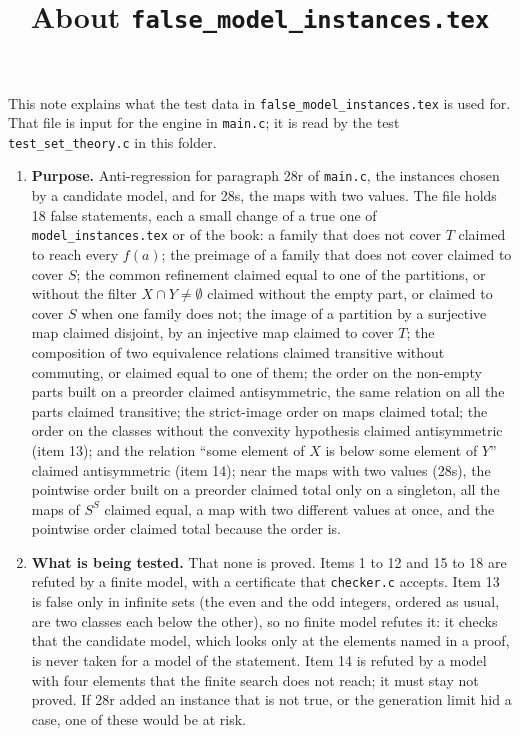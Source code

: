 \documentclass[11pt,a4paper]{article}
\title{About \texttt{false\_model\_instances.tex}}
\author{}
\date{}
\begin{document}
\maketitle
This note explains what the test data in \texttt{false\_model\_instances.tex} is used for. That file is input for the engine in \texttt{main.c}; it is read by the test \texttt{test\_set\_theory.c} in this folder.

\begin{enumerate}
\item \textbf{Purpose.} Anti-regression for paragraph 28r of \texttt{main.c}, the instances chosen by a candidate model, and for 28s, the maps with two values. The file holds 18 false statements, each a small change of a true one of \texttt{model\_instances.tex} or of the book: a family that does not cover $T$ claimed to reach every $f(a)$; the preimage of a family that does not cover claimed to cover $S$; the common refinement claimed equal to one of the partitions, or without the filter $X \cap Y \neq \emptyset$ claimed without the empty part, or claimed to cover $S$ when one family does not; the image of a partition by a surjective map claimed disjoint, by an injective map claimed to cover $T$; the composition of two equivalence relations claimed transitive without commuting, or claimed equal to one of them; the order on the non-empty parts built on a preorder claimed antisymmetric, the same relation on all the parts claimed transitive; the strict-image order on maps claimed total; the order on the classes without the convexity hypothesis claimed antisymmetric (item 13); and the relation ``some element of $X$ is below some element of $Y$'' claimed antisymmetric (item 14); near the maps with two values (28s), the pointwise order built on a preorder claimed total only on a singleton, all the maps of $S^{S}$ claimed equal, a map with two different values at once, and the pointwise order claimed total because the order is.

\item \textbf{What is being tested.} That none is proved. Items 1 to 12 and 15 to 18 are refuted by a finite model, with a certificate that \texttt{checker.c} accepts. Item 13 is false only in infinite sets (the even and the odd integers, ordered as usual, are two classes each below the other), so no finite model refutes it: it checks that the candidate model, which looks only at the elements named in a proof, is never taken for a model of the statement. Item 14 is refuted by a model with four elements that the finite search does not reach; it must stay not proved. If 28r added an instance that is not true, or the generation limit hid a case, one of these would be at risk.


\end{enumerate}
\end{document}
